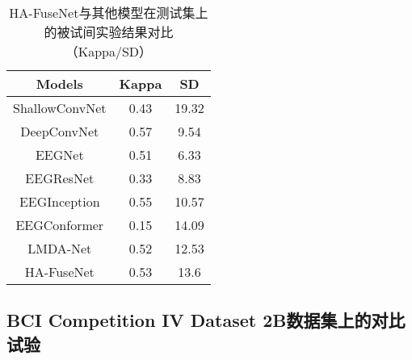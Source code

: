 \begin{table}[ht]
    \centering
    \caption{HA-FuseNet与其他模型在测试集上的被试间实验结果对比（Kappa/SD）}
    \label{tab:2acomparecrosssd}
    \begin{tabularx}{\textwidth}{CCC}
      \toprule
      Models & Kappa & SD \\
      \midrule
      ShallowConvNet\cite{schirrmeister2017deep} &0.43&19.32 \\
      DeepConvNet\cite{schirrmeister2017deep} &0.57&9.54\\
      EEGNet\cite{lawhern2018eegnet} &0.51& 6.33\\
      EEGResNet\cite{HBM:HBM23730} &0.33&8.83\\
      EEGInception\cite{zhang2021eeg} &0.55&10.57\\
      EEGConformer\cite{song2022eeg}&0.15&14.09 \\
      LMDA-Net\cite{miao2023lmda} &0.52&12.53\\
      \midrule 
      HA-FuseNet &0.53&13.6\\
      \bottomrule
    \end{tabularx}
\end{table}


\subsection{BCI Competition IV Dataset 2B数据集上的对比试验}

